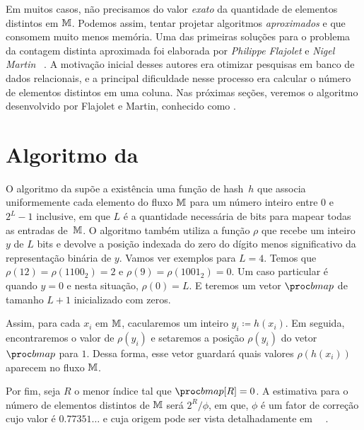Em muitos casos, não precisamos do valor \textit{exato} da quantidade de elementos distintos em $\mathbb{M}$. Podemos assim, 
tentar projetar algoritmos \textit{aproximados} e que consomem muito menos memória. Uma das primeiras soluções para o 
problema da contagem distinta aproximada foi elaborada por \textit{Philippe Flajolet} e \textit{Nigel Martin}
~\citep{flajolet:martin:85}. A motivação inicial desses autores era otimizar pesquisas em banco de dados relacionais, e 
a principal dificuldade nesse processo era calcular o número de elementos distintos em uma coluna. Nas próximas seções, 
veremos o algoritmo desenvolvido por Flajolet e Martin, conhecido como .

\section{Algoritmo da }
\label{sec:flajolet-martin:algorithm}

O algoritmo da  supõe a existência uma função de hash~$h$ que associa uniformemente cada 
elemento do fluxo $\mathbb{M}$ para um número inteiro entre $0$ e $2^L-1$ inclusive, em que $L$ é a quantidade necessária de 
bits para mapear todas as entradas de~$\mathbb{M}$. O algoritmo também utiliza a função $\rho$ que recebe um inteiro $y$ de 
$L$ bits e devolve a posição indexada do zero do dígito menos significativo da representação binária de $y$. Vamos ver 
exemplos para $L = 4$. Temos que $\rho(12) = \rho(1100_2) = 2$ e $\rho(9) = \rho(1001_2) = 0$. Um caso particular é 
quando $y = 0$ e nesta situação, $\rho(0) = L$. E teremos um vetor $\bitmap$ de tamanho $L + 1$ inicializado com zeros.

Assim, para cada $x_i$ em $\mathbb{M}$, cacularemos um inteiro $y_i \coloneqq h(x_i)$. Em seguida, encontraremos o valor de 
$\rho(y_i)$ e setaremos a posição $\rho(y_i)$ do vetor $\bitmap$ para $1$. Dessa forma, esse vetor guardará quais valores 
$\rho(h(x_i))$ aparecem no fluxo $\mathbb{M}$.

Por fim, seja $R$ o menor índice tal que $\bitmap[R] = 0$. A estimativa para o número de elementos distintos de 
$\mathbb{M}$ será $2^R/\phi$, em que, $\phi$ é um fator de correção cujo valor é $0.77351{\dots}$ e cuja origem pode ser vista
detalhadamente em ~~\citep{flajolet:martin:85}.

